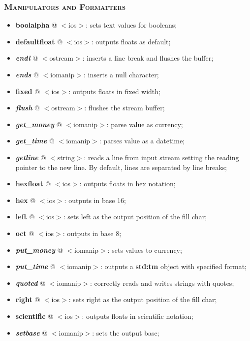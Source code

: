 \documentclass[10pt]{article}
\begin{document}
\begin{multicols*}{4}
{\subsubsection*{\textsc{Manipulators and Formatters}} 
\begin{itemize}[leftmargin=*,topsep=0.25pt]
  \setlength\itemsep{-1.8pt}
	\item \textbf{boolalpha} @ $<$ios$>$: sets text values for booleans;
	\item \textbf{defaultfloat} @ $<$ios$>$: outputs floats as default;
	\item \emph{\textbf{endl}} @ $<$ostream$>$: inserts a line break and flushes the buffer; 
	\item \emph{\textbf{ends}} @ $<$iomanip$>$: inserts a null character; 
	\item \textbf{fixed} @ $<$ios$>$: outputs floats in fixed width;
	\item \emph{\textbf{flush}} @ $<$ostream$>$: flushes the stream buffer; 
	\item \emph{\textbf{get\_money}} @ $<$iomanip$>$: parse value as currency; 
	\item \emph{\textbf{get\_time}} @ $<$iomanip$>$: parses value as a datetime; 
	\item \emph{\textbf{getline}} @ $<$string$>$:  reads a line from input stream setting the reading pointer to the new line. By default, lines are separated by line breaks;
	\item \textbf{hexfloat} @ $<$ios$>$: outputs floats in hex notation;
	\item \textbf{hex} @ $<$ios$>$: outputs in base 16;
	\item \textbf{left} @ $<$ios$>$: sets left as the output position of the fill char;
	\item \textbf{oct} @ $<$ios$>$: outputs in base 8;
	\item \emph{\textbf{put\_money}} @ $<$iomanip$>$: sets values to currency; 
	\item \emph{\textbf{put\_time}} @ $<$iomanip$>$: outputs a \textbf{std:tm} object with specified format; 
	\item \emph{\textbf{quoted}} @ $<$iomanip$>$: correctly reads and writes strings with quotes; 
	\item \textbf{right} @ $<$ios$>$: sets right as the output position of the fill char;
	\item \textbf{scientific} @ $<$ios$>$: outputs floats in scientific notation;
	\item \emph{\textbf{setbase}} @ $<$iomanip$>$: sets the output base; 

\end{itemize}}
\end{multicols*}
\end{document}
